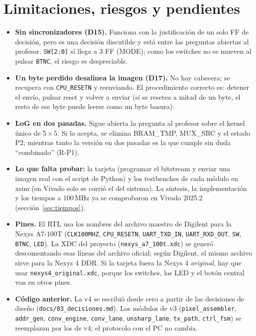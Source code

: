\documentclass[11pt,a4paper]{article}
\newcommand{\bus}[1]{\texttt{#1}}
\begin{document}
\section{Limitaciones, riesgos y pendientes}
\begin{itemize}
\item \textbf{Sin sincronizadores (D15).} Funciona con la justificación de un solo FF de decisión, pero es una decisión discutible y está entre las preguntas abiertas al profesor. \bus{SW[2:0]} sí llega a 3 FF (MODE); como los switches no se mueven al pulsar \bus{BTNC}, el riesgo es despreciable.
\item \textbf{Un byte perdido desalinea la imagen (D17).} No hay cabecera; se recupera con \bus{CPU\_RESETN} y reenviando. El procedimiento correcto es: detener el envío, pulsar reset y volver a enviar (si se resetea a mitad de un byte, el resto de ese byte puede leerse como un byte basura).
\item \textbf{LoG en dos pasadas.} Sigue abierta la pregunta al profesor sobre el kernel único de 5\,×\,5. Si lo acepta, se elimina BRAM\_TMP, MUX\_SRC y el estado P2; mientras tanto la versión en dos pasadas es la que cumple sin duda ``combinado'' (R-P1).
\item \textbf{Lo que falta probar:} la tarjeta (programar el bitstream y enviar una imagen real con el script de Python) y los testbenches de cada módulo en xsim (en Vivado solo se corrió el del sistema). La síntesis, la implementación y los tiempos a 100\,MHz ya se comprobaron en Vivado 2025.2 (sección~\ref{sec:tiempos}).
\item \textbf{Pines.} El RTL usa los nombres del archivo maestro de Digilent para la Nexys A7-100T (\texttt{CLK100MHZ}, \texttt{CPU\_RESETN}, \texttt{UART\_TXD\_IN}, \texttt{UART\_RXD\_OUT}, \texttt{SW}, \texttt{BTNC}, \texttt{LED}). La XDC del proyecto (\texttt{nexys\_a7\_100t.xdc}) se generó descomentando esas líneas del archivo oficial; según Digilent, el mismo archivo sirve para la Nexys 4 DDR. Si la tarjeta fuera la Nexys 4 \emph{original}, hay que usar \texttt{nexys4\_original.xdc}, porque los switches, los LED y el botón central van en otros pines.
\item \textbf{Código anterior.} La v4 se escribió desde cero a partir de las decisiones de diseño (\texttt{docs/03\_decisiones.md}). Los módulos de v3 (\texttt{pixel\_assembler}, \texttt{addr\_gen}, \texttt{conv\_engine}, \texttt{conv\_lane}, \texttt{unsharp\_lane}, \texttt{tx\_path}, \texttt{ctrl\_fsm}) se reemplazan por los de v4; el protocolo con el PC no cambia.
\end{itemize}
\end{document}
